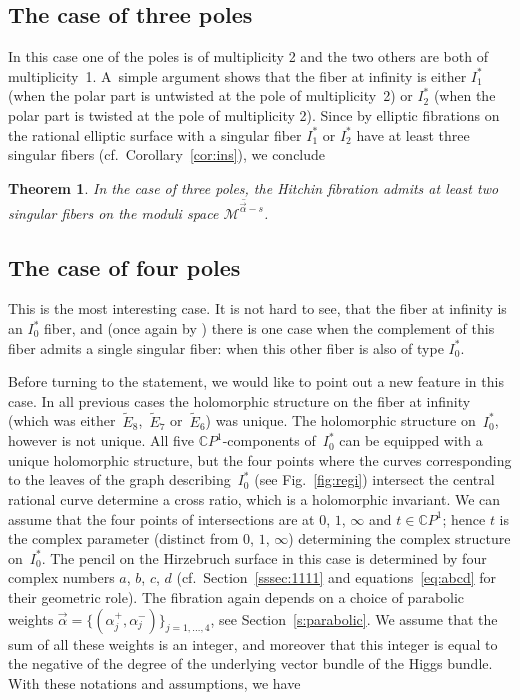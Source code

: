 \documentclass[pdftex]{sigma}
\newcommand{\CP}[1]{\mathbb{C}P^{#1}} %
\newcommand{\Et}[1]{\widetilde{E}_{#1}} %
\newcommand{\Mod}{{\mathcal M}} %
\numberwithin{equation}{section}
\newtheorem{thm}[prop]{Theorem}
\begin{document}
\subsection{The case of three poles}\label{ss:ThreePoles}
In this case one of the poles is of multiplicity 2 and the two others
are both of multiplicity~1. A~simple argument shows that the
fiber at infinity is either $I_1^*$ (when the polar part is untwisted
at the pole of multiplicity~2) or $I_2^*$
(when the polar part is twisted at the pole of multiplicity 2).
Since by \cite[Section~6]{SSS} elliptic fibrations on the rational elliptic
surface with a singular fiber $I_1^*$ or $I_2^*$ have at least three
singular fibers (cf.\ Corollary~\ref{cor:ins}), we conclude

\begin{thm}\label{thm:ThreePoles}
In the case of three poles, the Hitchin fibration admits at least two
singular fibers on the moduli space ${\overline{\Mod ^{\vec{\alpha}-s}}}$.
\end{thm}

\subsection{The case of four poles}\label{ss:FourPoles}
This is the most interesting case. It is not hard to see, that the
fiber at infinity is an $I_0^*$ fiber, and (once again by
\cite[Section~6]{SSS}) there is one case when the complement of this
fiber admits a single singular fiber: when this other fiber is also of
type $I_0^*$.

Before turning to the statement, we would like to point out a new
feature in this case. In all previous cases the holomorphic structure
on the fiber at infinity (which was either~$\Et8$,~$\Et7$ or~$\Et6$) was
unique. The holomorphic structure on~$I_0^*$, however is not
unique. All five $\CP{1}$-components of~$I_0^*$ can be equipped with a
unique holomorphic structure, but the four points where the curves
corresponding to the leaves of the graph describing~$I_0^*$ (see
Fig.~\ref{fig:regi}) intersect the central rational curve determine
a cross ratio, which is a holomorphic invariant.
We can assume that the four points of intersections are at
$0$, $1$, $\infty$ and $t\in \CP{1}$; hence $t$ is the complex parameter
(distinct from $0$, $1$, $\infty$) determining the complex structure on~$I_0^*$. The pencil {on the Hirzebruch surface} in this case is determined by four complex numbers
$a$, $b$, $c$, $d$ (cf.\ Section~\ref{sssec:1111} and equations~\eqref{eq:abcd} for their geometric role).
The fibration again depends on a choice of parabolic weights
$\vec{\alpha} = \{ (\alpha_j^+, \alpha_j^-) \}_{j=1,\ldots ,4}$, see Section~\ref{s:parabolic}.
We assume that the sum of all these weights is an integer, and moreover that
this integer is equal to the negative of the degree of the underlying vector
bundle of the Higgs bundle. With these notations and assumptions, we have
\end{document}
